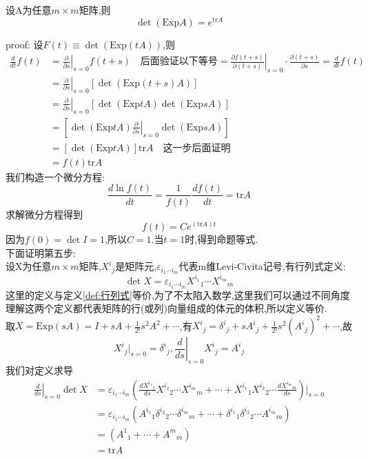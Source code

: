 \documentclass[../main.tex]{subfiles}
\begin{document}
 \begin{lemma}
     设A为任意$m\times m$矩阵,则
     $$\det(\text{Exp}A) = e^{\text{tr} A}$$
 \end{lemma}
 proof: 设$F(t) \equiv \det(\text{Exp}(tA))$,则
 \begin{align*}
     \frac{d}{dt}f(t) &= \left.\frac{\partial}{\partial s}\right|_{s=0}f(t+s)\quad\text{后面验证以下等号} = \left.\frac{\partial f(t + s)}{\partial (t +s)}\right|_{s=0}\cdot \frac{\partial (t+s)}{\partial s} = \frac{d}{dt}f(t)\\
     &=\left.\frac{\partial}{\partial s}\right|_{s=0}[\det(\text{Exp}(t+s)A)]\\
     &=\left.\frac{\partial}{\partial s}\right|_{s=0}[\det(\text{Exp}tA)\det(\text{Exp}sA)]\\
     &=[\det(\text{Exp}tA)\left.\frac{\partial}{\partial s}\right|_{s=0}\det(\text{Exp}sA)]\\
     &=[\det(\text{Exp}tA)]\text{tr}A\quad \text{这一步后面证明}\\
     &=f(t)\text{tr}A
 \end{align*}
 我们构造一个微分方程:
 \begin{equation*}
     \frac{d \ln f(t)}{dt} = \frac{1}{f(t)}\frac{d f(t)}{dt} = \text{tr}A
 \end{equation*}
 求解微分方程得到
 \begin{equation*}
     f(t) = C e^{(\text{tr}A)t}
 \end{equation*}
 因为$f(0) = \det I = 1$,所以$C = 1$.当$t = 1$时,得到命题等式.\\
 下面证明第五步:\\
 设X为任意$m\times m$矩阵,$X^i{}_j$是矩阵元,$\varepsilon_{i_1\cdots i_m}$代表m维Levi-Civita记号,有行列式定义:
 $$\det X = \varepsilon_{i_1\cdots i_m}X^{i_1}{}_1\cdots X^{i_m}{}_m$$
 这里的定义与定义\ref{def:行列式}等价,为了不太陷入数学,这里我们可以通过不同角度理解这两个定义都代表矩阵的行(或列)向量组成的体元的体积,所以定义等价.\\
 取$X = \text{Exp}(sA) = I + sA + \frac{1}{2!}s^2A^2 +\cdots$,有$X^i{}_j = \delta^i{}_j + s A^i{}_j +\frac{1}{2!}s^2(A^i{}_j)^2 +\cdots$,故
 $$X^i{}_j|_{s=0} = \delta^i{}_j,\left.\frac{d}{ds}\right|_{s=0}X^i{}_j = A^i{}_j$$
 我们对定义求导
 \begin{align*}
     \left.\frac{d}{ds}\right|_{s=0} \det X &= \varepsilon_{i_1\cdots i_m}(\frac{d X^{i_1}{}_1}{ds}X^{i_2}{}_2\cdots X^{i_m}{}_m+\cdots + X^{i_1}{}_1X^{i_2}{}_2\cdots \frac{d X^{i_m}{}_m}{ds})|_{s=0}\\
     &=\varepsilon_{i_1\cdots i_m}(A^{i_1}{}_1\delta^{i_2}{}_2 \cdots \delta^{i_m}{}_m +\cdots + \delta^{i_1}{}_1 \delta^{i_2}{}_2 \cdots A^{i_m}{}_m)\\
     &=(A^1{}_1 + \cdots +A^m{}_m)\\
     &=\text{tr}A
 \end{align*}
\end{document}
